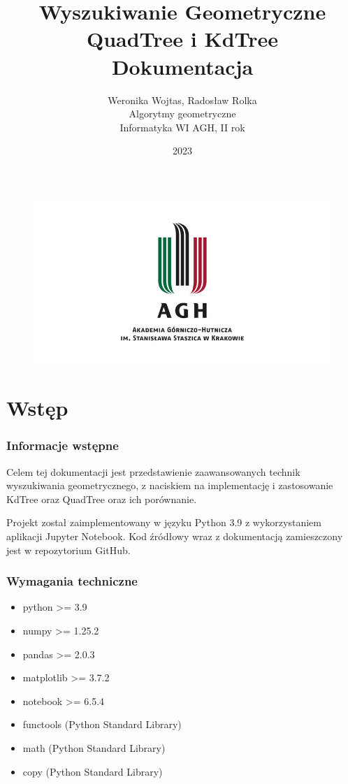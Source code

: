 \documentclass{lab}
\begin{document}
\begin{figure}
    \centering
    \includegraphics{resources/agh.png}
\end{figure}
\title{\Huge \textbf{Wyszukiwanie Geometryczne}\\QuadTree i KdTree \\ \huge Dokumentacja}
\author{Weronika Wojtas, Radosław Rolka\\Algorytmy geometryczne\\Informatyka WI AGH, II rok}
\date{2023}

\maketitle
\newpage
\tableofcontents
\thispagestyle{fancy} 
\newpage

\part{Wstęp}
\section{Informacje wstępne}
Celem tej dokumentacji jest przedstawienie zaawansowanych technik wyszukiwania geometrycznego, z naciskiem na implementację i zastosowanie KdTree oraz QuadTree oraz ich porównanie.

Projekt został zaimplementowany w języku Python 3.9 z wykorzystaniem aplikacji Jupyter Notebook. Kod źródłowy wraz z dokumentacją zamieszczony jest w repozytorium GitHub.

\section{Wymagania techniczne}
\begin{itemize}
    \item python >= 3.9
    \item numpy >= 1.25.2
    \item pandas >= 2.0.3
    \item matplotlib >= 3.7.2
    \item notebook >= 6.5.4
    \item functools (Python Standard Library)
    \item math (Python Standard Library)
    \item copy (Python Standard Library)
\end{itemize}
\end{document}
